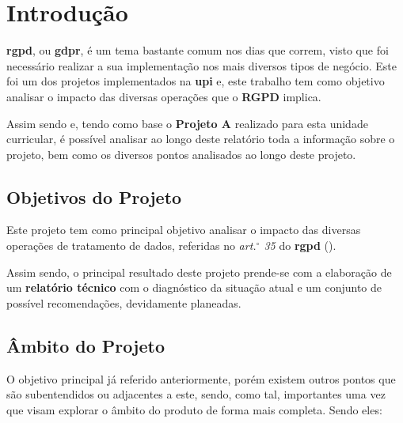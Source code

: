\section{Introdução}

\textbf{\acrshort{rgpd}}, ou \textbf{\acrshort{gdpr}}, é um tema bastante comum nos dias que correm, visto que foi necessário realizar a sua implementação nos mais diversos tipos de negócio. Este foi um dos projetos implementados na \textbf{\acrshort{upi}} e, este trabalho tem como objetivo analisar o impacto das diversas operações que o \textbf{RGPD} implica.

Assim sendo e, tendo como base o \textbf{Projeto A} realizado para esta unidade curricular,  é possível analisar ao longo deste relatório toda a informação sobre o projeto, bem como os diversos pontos analisados ao longo deste projeto.

\subsection{Objetivos do Projeto}

Este projeto tem como principal objetivo analisar o impacto das diversas operações de tratamento de dados, referidas no \textit{art.$^\circ$ 35} do \textbf{\acrshort{rgpd}} ().

Assim sendo, o principal resultado deste projeto prende-se com a elaboração de um \textbf{relatório técnico} com o diagnóstico da situação atual e um conjunto de possível recomendações, devidamente planeadas.

\subsection{Âmbito do Projeto}

O objetivo principal já referido anteriormente, porém existem outros pontos que são subentendidos ou adjacentes a este, sendo, como tal, importantes uma vez que visam explorar o âmbito do produto de forma mais completa. Sendo eles:


